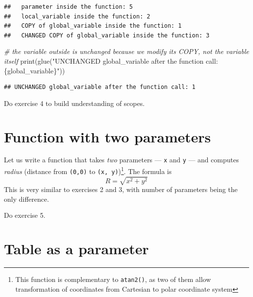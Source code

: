 \documentclass[
]{book}
\newenvironment{Shaded}{\begin{snugshade}}{\end{snugshade}}
\newcommand{\CommentTok}[1]{\textcolor[rgb]{0.56,0.35,0.01}{\textit{#1}}}
\newcommand{\FunctionTok}[1]{\textcolor[rgb]{0.00,0.00,0.00}{#1}}
\newcommand{\NormalTok}[1]{#1}
\newcommand{\StringTok}[1]{\textcolor[rgb]{0.31,0.60,0.02}{#1}}
\begin{document}
\begin{verbatim}
##   parameter inside the function: 5
##   local_variable inside the function: 2
##   COPY of global_variable inside the function: 1
##   CHANGED COPY of global_variable inside the function: 3
\end{verbatim}

\begin{Shaded}
\begin{Highlighting}[]
\CommentTok{\# the variable outside is unchanged because we modify its COPY, not the variable itself}
\FunctionTok{print}\NormalTok{(}\FunctionTok{glue}\NormalTok{(}\StringTok{"UNCHANGED global\_variable after the function call: \{global\_variable\}"}\NormalTok{))}
\end{Highlighting}
\end{Shaded}

\begin{verbatim}
## UNCHANGED global_variable after the function call: 1
\end{verbatim}

Do exercise 4 to build understanding of scopes.

\hypertarget{function-with-two-parameters}{%
\section{Function with two parameters}\label{function-with-two-parameters}}

Let us write a function that takes \emph{two} parameters --- \texttt{x} and \texttt{y} --- and computes \emph{radius} (distance from \texttt{(0,0)} to \texttt{(x,\ y)})\footnote{This function is complementary to \texttt{atan2()}, as two of them allow transformation of coordinates from Cartesian to polar coordinate system}. The formula is
\[R = \sqrt{x^2 + y^2}\]
This is very similar to exercises 2 and 3, with number of parameters being the only difference.

Do exercise 5.

\hypertarget{table-as-a-parameter}{%
\section{Table as a parameter}\label{table-as-a-parameter}}
\end{document}
